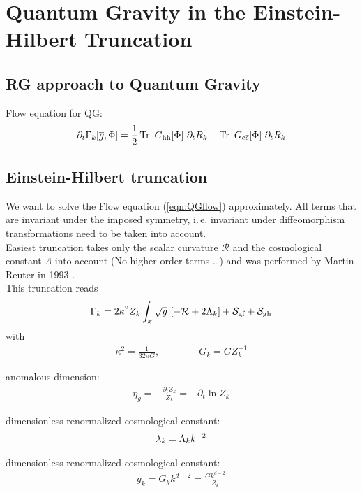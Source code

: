 \chapter{Quantum Gravity in the Einstein-Hilbert Truncation}
\section{RG approach to Quantum Gravity}
Flow equation for QG:
\begin{align}
	\partial_t\Gamma_{k}[\overline{g}, \Phi] = \frac{1}{2} \operatorname{Tr}\ G_{\text{hh}}[\Phi] \ \partial_tR_k - \operatorname{Tr}\ G_{\text{c}\overline{\text{c}}}[\Phi] \ \partial_tR_k
\end{align}

\section{Einstein-Hilbert truncation}
We want to solve the Flow equation (\ref{eqn:QGflow}) approximately. All terms that are invariant under the imposed symmetry, i.\,e. invariant under diffeomorphism transformations need to be taken into account. \\

Easiest truncation takes only the scalar curvature $\mathcal{R}$ and the cosmological constant $\Lambda$ into account (No higher order terms \dots) and was performed by Martin Reuter in 1993 \cite{ReuterSaueressig2002}. \\


This truncation reads
\begin{align}
	\Gamma_{k} = 2\kappa^2Z_k \int_x \sqrt{g} \ [-\mathcal{R} + 2\Lambda_k] + \mathcal{S}_{\text{gf}} + \mathcal{S}_{\text{gh}}
\label{eqn:QGflow}
\end{align}
with 
\begin{align}
	\kappa^2 = \frac{1}{32\pi G}, \qquad\qquad G_k = GZ^{-1}_k
\end{align}

anomalous dimension: 
\begin{align*}
	\eta_g = -\frac{\partial_t Z_k}{Z_k} = -\partial_t \ln Z_k
\end{align*}

dimensionless renormalized cosmological constant:
\begin{align*}
	\lambda_k = \Lambda_k k^{-2}
\end{align*}

dimensionless renormalized cosmological constant:
\begin{align*}
	g_k = G_k k^{d-2} = \frac{Gk^{d-2}}{Z_k}
\end{align*}

